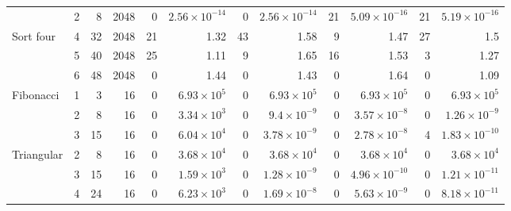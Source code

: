 \begin{table}[htbp]
\begin{tabular*}{\linewidth}{@{\extracolsep{\fill}}lrrr *{4}{rr}@{}}
 & 2 & 8 & 2048 & 0 & $2.56\!\times\!10^{-14}$ & 0 & $2.56\!\times\!10^{-14}$ & 21 & $5.09\!\times\!10^{-16}$ & 21 & $5.19\!\times\!10^{-16}$ \\
\addlinespace[0.7pt]
Sort four & 4 & 32 & 2048 & 21 & 1.32 & 43 & 1.58 & 9 & 1.47 & 27 & 1.5 \\
 & 5 & 40 & 2048 & 25 & 1.11 & 9 & 1.65 & 16 & 1.53 & 3 & 1.27 \\
 & 6 & 48 & 2048 & 0 & 1.44 & 0 & 1.43 & 0 & 1.64 & 0 & 1.09 \\
\addlinespace[0.7pt]
Fibonacci & 1 & 3 & 16 & 0 & $6.93\!\times\!10^{5}$ & 0 & $6.93\!\times\!10^{5}$ & 0 & $6.93\!\times\!10^{5}$ & 0 & $6.93\!\times\!10^{5}$ \\
 & 2 & 8 & 16 & 0 & $3.34\!\times\!10^{3}$ & 0 & $9.4\!\times\!10^{-9}$ & 0 & $3.57\!\times\!10^{-8}$ & 0 & $1.26\!\times\!10^{-9}$ \\
 & 3 & 15 & 16 & 0 & $6.04\!\times\!10^{4}$ & 0 & $3.78\!\times\!10^{-9}$ & 0 & $2.78\!\times\!10^{-8}$ & 4 & $1.83\!\times\!10^{-10}$ \\
\addlinespace[0.7pt]
Triangular & 2 & 8 & 16 & 0 & $3.68\!\times\!10^{4}$ & 0 & $3.68\!\times\!10^{4}$ & 0 & $3.68\!\times\!10^{4}$ & 0 & $3.68\!\times\!10^{4}$ \\
 & 3 & 15 & 16 & 0 & $1.59\!\times\!10^{3}$ & 0 & $1.28\!\times\!10^{-9}$ & 0 & $4.96\!\times\!10^{-10}$ & 0 & $1.21\!\times\!10^{-11}$ \\
 & 4 & 24 & 16 & 0 & $6.23\!\times\!10^{3}$ & 0 & $1.69\!\times\!10^{-8}$ & 0 & $5.63\!\times\!10^{-9}$ & 0 & $8.18\!\times\!10^{-11}$ \\
\bottomrule
\end{tabular*}\endgroup
\end{table}


